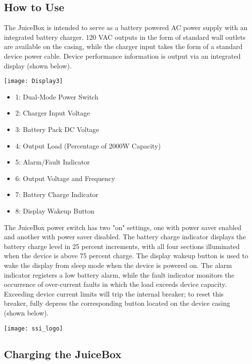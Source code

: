\documentclass[../jb_user_manual.tex]{subfiles}
\begin{document}
\subsection{\Large{How to Use}} 

The JuiceBox is intended to serve as a battery powered AC power supply with an integrated battery charger.  120 VAC outputs in the form of standard wall outlets are available on the casing, while the charger input takes the form of a standard device power cable.  Device performance information is output via an integrated display (shown below).

\vspace{3mm}
\texttt{[image: Display3]}
\vspace{3mm}

\begin{itemize}
	\item{1: Dual-Mode Power Switch}
	\item{2: Charger Input Voltage}
	\item{3: Battery Pack DC Voltage}
	\item{4: Output Load (Percentage of 2000W Capacity)}
	\item{5: Alarm/Fault Indicator}
	\item{6: Output Voltage and Frequency}
	\item{7: Battery Charge Indicator}
	\item{8: Display Wakeup Button}
\end{itemize}

The JuiceBox power switch has two "on" settings, one with power saver enabled and another with power saver disabled.  The battery charge indicator displays the battery charge level in 25 percent increments, with all four sections illuminated when the device is above 75 percent charge.  The display wakeup button is used to wake the display from sleep mode when the device is powered on.  The alarm indicator registers a low battery alarm, while the fault indicator monitors the occurrence of over-current faults in which the load exceeds device capacity.  Exceeding device current limits will trip the internal breaker; to reset this breaker, fully depress the corresponding button located on the device casing (shown below).

\vspace{3mm}
\texttt{[image: ssi\_logo]}
\vspace{3mm}

\subsection{\Large{Charging the JuiceBox}}
\end{document}
